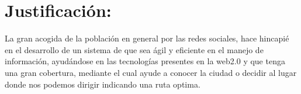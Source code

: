   \section{Justificación:} %
  \label{sec:justificacion}
    La gran acogida de la población en general por las redes sociales, hace 
    hincapié en el desarrollo de un sistema de  que sea ágil y eficiente en el 
    manejo de información, ayudándose en las tecnologías  presentes en la web2.0 y 
    que tenga una gran cobertura, mediante el cual  ayude a conocer la ciudad  o 
    decidir al lugar donde nos podemos dirigir indicando una ruta optima.



  
  
  





  
